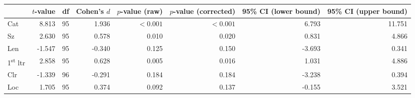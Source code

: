 \begin{tabular}{lrrrrrrr}
\toprule
{} & $t$-value & df & Cohen's $d$ & $p$-value (raw) & $p$-value (corrected) & 95\% CI (lower bound) & 95\% CI (upper bound) \\
\midrule
Cat                       &     8.813 & 95 &       1.936 &       $< 0.001$ &             $< 0.001$ &                 6.793 &                11.751 \\
Sz                        &     2.630 & 95 &       0.578 &           0.010 &                 0.020 &                 0.831 &                 4.866 \\
Len                       &    -1.547 & 95 &      -0.340 &           0.125 &                 0.150 &                -3.693 &                 0.341 \\
1\textsuperscript{st} ltr &     2.858 & 95 &       0.628 &           0.005 &                 0.016 &                 1.031 &                 4.886 \\
Clr                       &    -1.339 & 96 &      -0.291 &           0.184 &                 0.184 &                -3.238 &                 0.394 \\
Loc                       &     1.705 & 95 &       0.374 &           0.092 &                 0.137 &                -0.155 &                 3.521 \\
\bottomrule
\end{tabular}
